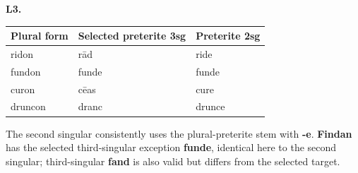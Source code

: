 \par\begin{minipage}{\linewidth}\raggedright
\textbf{L3.}

\par\begingroup
\fontsize{10.5}{13.2}\selectfont
\setlength{\LTleft}{0pt}\setlength{\LTright}{\fill}
\noindent
\begin{tabular}{@{}>{\raggedright\arraybackslash}p{33.21mm}>{\raggedright\arraybackslash}p{49.31mm}>{\raggedright\arraybackslash}p{35.86mm}@{}}
\toprule
\textbf{Plural form} & \textbf{Selected preterite 3sg} & \textbf{Preterite 2sg} \\
\midrule
ridon & rād & ride \\
fundon & funde & funde \\
curon & cēas & cure \\
druncon & dranc & drunce \\
\bottomrule
\end{tabular}
\par\endgroup

The second singular consistently uses the plural-preterite stem with \textbf{-e}. \textbf{Findan} has the selected third-singular exception \textbf{funde}, identical here to the second singular; third-singular \textbf{fand} is also valid but differs from the selected target.

\end{minipage}\par\addvspace{4pt}

